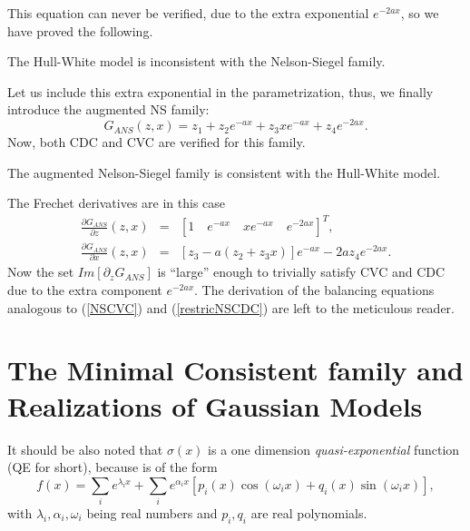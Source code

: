 This equation can never be verified, due to the extra exponential
$e^{-2 a x}$, so we have proved the following.  
\begin{propos} The Hull-White model is
  inconsistent with the Nelson-Siegel family.
\end{propos}
Let us include this extra exponential in the parametrization, thus, we
finally introduce the augmented NS family:  
$$
G_{ANS}(z,x)=z_1 + z_2 e^{-a x} + z_3 x e^{-a x}+ z_4 e^{-2 a x}.
$$
Now, both CDC and CVC are verified for this family. 
\begin{propos} The augmented
  Nelson-Siegel family is consistent with the Hull-White model.
\end{propos} 
\begin{demo}
The Frechet derivatives are in this case 
\begin{equation}
\label{rcl}
\begin{array}{rcl}
\displaystyle\frac{\partial G_{ANS}}{\partial z} (z,x) &=& [1\quad e^{-a x}\quad xe^{-a
  x}\quad e^{-2 a x}]^T,\\[.2cm]
\displaystyle\frac{\partial G_{ANS}}{\partial x} (z,x) &=& \left[ z_3-a\left( z_2 + z_3
    x\right)\right] e^{-a x}-2 a z_4 e^{-2 a x}.  
\end{array}
\end{equation}
Now the set $Im[ \partial_zG_{ANS}]$ is ``large'' enough to trivially
satisfy CVC and CDC due to the extra component $e^{-2 a x}$. The
derivation of the balancing equations analogous to (\ref{NSCVC}) and 
(\ref{restricNSCDC}) are left to the meticulous reader. 
\end{demo}

\section{The Minimal Consistent family and Realizations of Gaussian Models} 
It should be also noted that $\sigma(x)$ is a one dimension {\sl
  quasi-exponential} function (QE for short), because is of the form 
\begin{equation}
\label{QE}
f(x)=\sum_i e^{\lambda_i x}+\sum_i e^{\alpha_i x}[p_i(x)\cos(\omega_i
x)+q_i(x)\sin(\omega_i x)],
\end{equation}
with $\lambda_i,\alpha_i,\omega_i$ being real numbers and $p_i, q_i$ are real
polynomials.  

